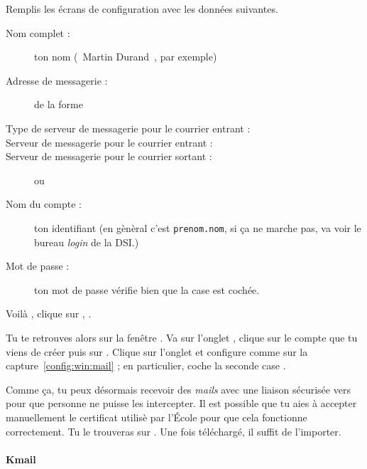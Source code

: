 Remplis les \'ecrans de configuration avec les donn\'ees suivantes.
\begin{description}
  \item[Nom complet : ] ton nom (\guillemotleft~Martin Durand~\guillemotright , par exemple)
  \item[Adresse de messagerie : ] de la forme 
  \item[Type de serveur de messagerie pour le courrier entrant : ] 
  \item[Serveur de messagerie pour le courrier entrant : ] 
  \item[Serveur de messagerie pour le courrier sortant : ]  ou \newline {}
  \item[Nom du compte : ] ton identifiant  (en g\`en\`eral c'est \texttt{prenom.nom}, si ça ne marche pas, va voir le bureau \emph{login} de la DSI.)
  \item[Mot de passe : ] ton mot de passe 
       v\'erifie bien que la case  est coch\'ee.
\end{description}

Voil\`a , clique sur , .

Tu te retrouves alors sur la fen\^etre . Va sur
l'onglet , clique sur le compte que tu viens de cr\'eer
puis sur . Clique sur l'onglet  et
configure comme sur la capture~\ref{config:win:mail} ; en
particulier, coche la seconde case .

Comme \c{c}a, tu peux d\'esormais recevoir des \emph{mails} avec une liaison
s\'ecuris\'ee vers  pour que personne ne puisse les
intercepter. Il est possible que tu aies à accepter manuellement le certificat utilis\`e par l'\'Ecole pour que cela fonctionne correctement. Tu le trouveras sur . Une fois t\'el\'echarg\'e, il suffit de l'importer.




\paragraph{Kmail}


